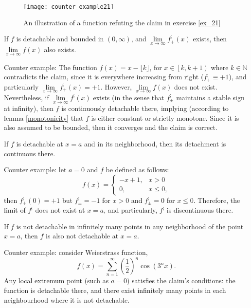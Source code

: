 \documentclass[11pt]{book}
\begin{document}
\begin{figure}[h!]
\texttt{[image: counter\_example21]}
\label{counter_example21}
\caption{An illustration of a function refuting the claim in exercise \ref{ex_21}}
\end{figure}

\begin{exercise}If $f$ is detachable and bounded in $\left(0,\infty\right)$,
and $\underset{x\rightarrow\infty}{\lim}f_{+}^{;}\left(x\right)$
exists, then $\underset{x\rightarrow\infty}{\lim}f\left(x\right)$
also exists.
\end{exercise}

Counter example: The function $f\left(x\right)=x-\lfloor k\rfloor$,
for $x\in\left[k,k+1\right)$ where $k\in\mathbb{N}$ contradicts
the claim, since it is everywhere increasing from right ($f_{+}^{;}\equiv+1$),
and particularly $\underset{x\rightarrow\infty}{\lim}f_{+}^{;}\left(x\right)=+1$.
However, $\underset{x\rightarrow\infty}{\lim}f\left(x\right)$ does
not exist. Nevertheless, if $\underset{x\rightarrow\infty}{\lim}f^{;}\left(x\right)$
exists (in the sense that $f_{\pm}^{;}$ maintains a stable sign at
infinity), then $f$ is continuously detachable there, implying (according
to lemma \ref{monotonicity} that $f$ is either constant
or strictly monotone. Since it is also assumed to be bounded, then
it converges and the claim is correct.

\begin{exercise}If $f$ is detachable at $x=a$ and in its neighborhood, then
its detachment is continuous there.
\end{exercise}

Counter example: let $a=0$ and $f$ be defined as follows:
\[
f\left(x\right)=\begin{cases}
-x+1, & x>0\\
0, & x\leq0,
\end{cases}
\]
then $f_{+}^{;}\left(0\right)=+1$ but $f_{\pm}^{;}=-1$ for $x>0$
and $f_{\pm}^{;}=0$ for $x\leq0$. Therefore, the limit of $f^{;}$
does not exist at $x=a$, and particularly, $f^{;}$ is discontinuous
there.

\begin{exercise}If $f$ is not detachable in infinitely many points in any neighborhood
of the point $x=a$, then $f$ is also not detachable at $x=a$.
\end{exercise}

Counter example: consider Weierstrass function, \[ f\left(x\right)=\sum_{n=1}^{\infty}\left(\frac{1}{2}\right)^{n}\cos\left(3^{n}x\right).\]
Any local extremum point (such as $a=0$) satisfies the claim's conditions:
the function is detachable there, and there exist infinitely many
points in each neighbourhood where it is not detachable.
\end{document}
